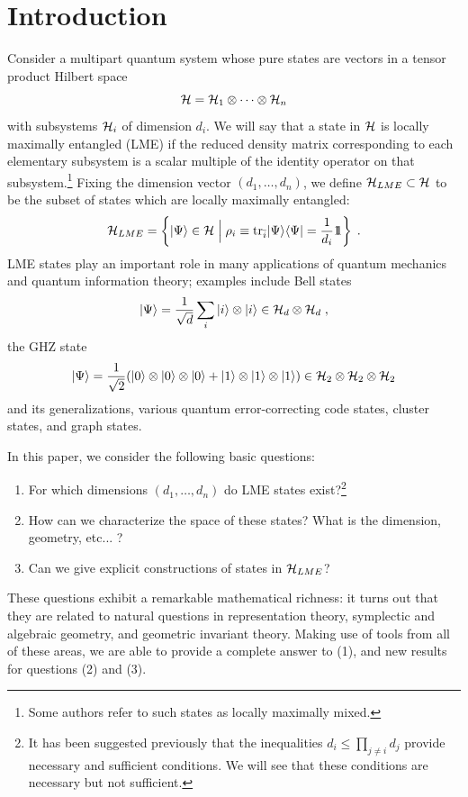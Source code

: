 \documentclass[12pt]{article}
\theoremstyle{definition}
\newcommand{\be}{\begin{equation}}
\newcommand{\ee}{\end{equation}}
\def\identity{{\rlap{1} \hskip 1.6pt \hbox{1}}}
\newcommand{\tr}{{\rm tr}}
\begin{document}
\setcounter{footnote}{0}

\section{Introduction}

Consider a multipart quantum system whose pure states are vectors in a tensor product Hilbert space
\[
{\cal H} = {\cal H}_{1}  \otimes \cdots  \otimes {\cal H}_{n}
\]
with subsystems ${\cal H}_i$ of dimension $d_i$. We will say that a state in ${\cal H}$ is locally maximally entangled (LME) if the reduced density matrix corresponding to each elementary subsystem is a scalar multiple of the identity operator on that subsystem.\footnote{Some authors refer to such states as locally maximally mixed.}
Fixing the dimension vector $(d_1,\dots,d_n)$, we define ${\cal H}_{LME} \subset {\cal H}$ to be the subset of states which are locally maximally entangled:
\be
{\cal H}_{LME} = \left\{|\Psi \rangle \in {\cal H} \; \Big| \; \rho_i \equiv \tr_{\bar{i}}|\Psi \rangle \langle \Psi | = \frac{1}{d_i} \identity \right\}\; .
\ee
LME states play an important role in many applications of quantum mechanics and quantum information theory; examples include Bell states
\be
\label{Bell}
|\Psi \rangle = \frac{1}{\sqrt{d}} \sum_{i} |i \rangle  \otimes |i \rangle \in {\cal H}_d  \otimes {\cal H}_d \; ,
\ee
the GHZ state
\be
\label{GHZ}
|\Psi \rangle = \frac{1}{\sqrt{2}} (|0 \rangle  \otimes |0 \rangle  \otimes |0 \rangle  + |1 \rangle  \otimes |1 \rangle  \otimes |1 \rangle) \in {\cal H}_2  \otimes {\cal H}_2  \otimes {\cal H}_2
\ee
and its generalizations, various quantum error-correcting code states, cluster states, and graph states.

In this paper, we consider the following basic questions:
\begin{enumerate}
\item
For which dimensions $(d_1,\dots,d_n)$ do LME states exist?\footnote{It has been suggested previously that the inequalities $d_i \le \prod_{j \ne i} d_j$ provide necessary and sufficient conditions. We will see that these conditions are necessary but not sufficient.}
\item
How can we characterize the space of these states? What is the dimension, geometry, etc... ?
\item
Can we give explicit constructions of states in ${\cal H}_{LME}$?
\end{enumerate}
These questions exhibit a remarkable mathematical richness: it turns out that they are related to natural questions in representation theory, symplectic and algebraic geometry, and geometric invariant theory. Making use of tools from all of these areas, we are able to provide a complete answer to (1), and new results for questions (2) and (3).
\end{document}
